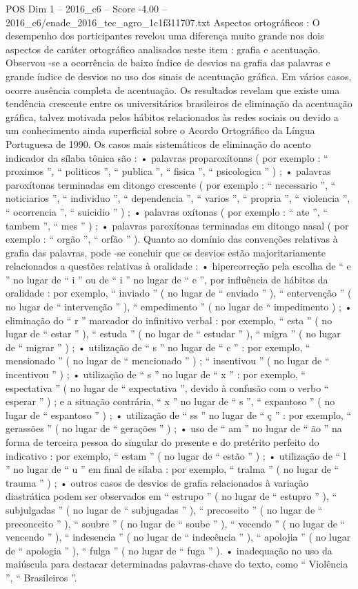 \begin{textsample}{POS Dim 1 – 2016\_c6 – Score -4.00 – 2016\_c6/enade\_2016\_tec\_agro\_1c1f311707.txt}
Aspectos ortográficos : O desempenho dos participantes revelou uma diferença muito grande nos dois aspectos de caráter ortográfico analisados neste item : grafia e acentuação.
Observou -se a ocorrência de baixo índice de desvios na grafia das palavras e grande índice de desvios no uso dos sinais de acentuação gráfica.
Em vários casos, ocorre ausência completa de acentuação.
Os resultados revelam que existe uma tendência crescente entre os universitários brasileiros de eliminação da acentuação gráfica, talvez motivada pelos hábitos relacionados às redes sociais ou devido a um conhecimento ainda superficial sobre o Acordo Ortográfico da Língua Portuguesa de 1990.
Os casos mais sistemáticos de eliminação do acento indicador da sílaba tônica são : • palavras proparoxítonas ( por exemplo : “ proximos ”, “ politicos ”, “ publica ”, “ fisica ”, “ psicologica ” ) ; • palavras paroxítonas terminadas em ditongo crescente ( por exemplo : “ necessario ”, “ noticiarios ”, “ individuo ”, “ dependencia ”, “ varios ”, “ propria ”, “ violencia ”, “ ocorrencia ”, “ suicidio ” ) ; • palavras oxítonas ( por exemplo : “ ate ”, “ tambem ”, “ mes ” ) ; • palavras paroxítonas terminadas em ditongo nasal ( por exemplo : “ orgão ”, “ orfão ” ).
Quanto ao domínio das convenções relativas à grafia das palavras, pode -se concluir que os desvios estão majoritariamente relacionados a questões relativas à oralidade : • hipercorreção pela escolha de “ e ” no lugar de “ i ” ou de “ i ” no lugar de “ e ”, por influência de hábitos da oralidade : por exemplo, “ inviado ” ( no lugar de “ enviado ” ), “ entervenção ” ( no lugar de “ intervenção ” ), “ empedimento ” ( no lugar de “ impedimento ) ; • eliminação do “ r ” marcador do infinitivo verbal : por exemplo, “ esta ” ( no lugar de “ estar ” ), “ estuda ” ( no lugar de “ estudar ” ), “ migra ” ( no lugar de “ migrar ” ) ; • utilização de “ s ” no lugar de “ c ” : por exemplo, “ mensionado ” ( no lugar de “ mencionado ” ) ; “ insentivou ” ( no lugar de “ incentivou ” ) ; • utilização de “ s ” no lugar de “ x ” : por exemplo, “ espectativa ” ( no lugar de “ expectativa ”, devido à confusão com o verbo “ esperar ” ) ; e a situação contrária, “ x ” no lugar de “ s ”, “ expantoso ” ( no lugar de “ espantoso ” ) ; • utilização de “ ss ” no lugar de “ ç ” : por exemplo, “ gerassões ” ( no lugar de “ gerações ” ) ; • uso de “ am ” no lugar de “ ão ” na forma de terceira pessoa do singular do presente e do pretérito perfeito do indicativo : por exemplo, “ estam ” ( no lugar de “ estão ” ) ; • utilização de “ l ” no lugar de “ u ” em final de sílaba : por exemplo, “ tralma ” ( no lugar de “ trauma ” ) ; • outros casos de desvios de grafia relacionados à variação diastrática podem ser observados em “ estrupo ” ( no lugar de “ estupro ” ), “ subjulgadas ” ( no lugar de “ subjugadas ” ), “ precoseito ” ( no lugar de “ preconceito ” ), “ soubre ” ( no lugar de “ soube ” ), “ vecendo ” ( no lugar de “ vencendo ” ), “ indesencia ” ( no lugar de “ indecência ” ), “ apolojia ” ( no lugar de “ apologia ” ), “ fulga ” ( no lugar de “ fuga ” ). • inadequação no uso da maiúscula para destacar determinadas palavras-chave do texto, como “ Violência ”, “ Brasileiros ”.

\end{textsample}
